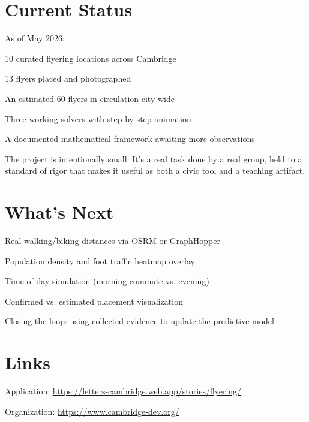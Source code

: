 \documentclass[sigconf,nonacm]{acmart}
\begin{document}
\section{Current Status}

As of May 2026:
\begin{enumerate*}[label=(\arabic*)]
    \item 10 curated flyering locations across Cambridge
    \item 13 flyers placed and photographed
    \item An estimated 60 flyers in circulation city-wide
    \item Three working solvers with step-by-step animation
    \item A documented mathematical framework awaiting more observations
\end{enumerate*}

The project is intentionally small. It's a real task done by a real group, held to a standard of rigor that makes it useful as both a civic tool and a teaching artifact.

\section{What's Next}

\begin{enumerate*}[label=(\arabic*)]
    \item Real walking/biking distances via OSRM or GraphHopper
    \item Population density and foot traffic heatmap overlay
    \item Time-of-day simulation (morning commute vs. evening)
    \item Confirmed vs. estimated placement visualization
    \item Closing the loop: using collected evidence to update the predictive model
\end{enumerate*}

\section*{Links}

\begin{enumerate*}[label=(\arabic*)]
    \item Application: \url{https://letters-cambridge.web.app/stories/flyering/}
    \item Organization: \url{https://www.cambridge-dev.org/}
\end{enumerate*}
\end{document}
